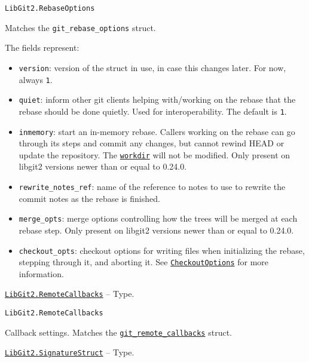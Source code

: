 \begin{adjustwidth}{2em}{0pt}


\begin{verbatim}
LibGit2.RebaseOptions
\end{verbatim}

Matches the \texttt{git\_rebase\_options} struct.

The fields represent:

\begin{itemize}
\item \texttt{version}: version of the struct in use, in case this changes later. For now, always \texttt{1}.


\item \texttt{quiet}: inform other git clients helping with/working on the rebase that the rebase should be done {\textquotedbl}quietly{\textquotedbl}. Used for interoperability. The default is \texttt{1}.


\item \texttt{inmemory}: start an in-memory rebase. Callers working on the rebase can go through its steps and commit any changes, but cannot rewind HEAD or update the repository. The \hyperlink{6689577338311178757}{\texttt{workdir}} will not be modified. Only present on libgit2 versions newer than or equal to 0.24.0.


\item \texttt{rewrite\_notes\_ref}: name of the reference to notes to use to rewrite the commit notes as the rebase is finished.


\item \texttt{merge\_opts}: merge options controlling how the trees will be merged at each rebase step.  Only present on libgit2 versions newer than or equal to 0.24.0.


\item \texttt{checkout\_opts}: checkout options for writing files when initializing the rebase, stepping through it, and aborting it. See \hyperlink{16441061243067746546}{\texttt{CheckoutOptions}} for more information.

\end{itemize}


\end{adjustwidth}
\hypertarget{5220283667301575523}{}
\hyperlink{5220283667301575523}{\texttt{LibGit2.RemoteCallbacks}}  -- {Type.}

\begin{adjustwidth}{2em}{0pt}


\begin{verbatim}
LibGit2.RemoteCallbacks
\end{verbatim}

Callback settings. Matches the \href{https://libgit2.org/libgit2/\#HEAD/type/git\_remote\_callbacks}{\texttt{git\_remote\_callbacks}} struct.



\end{adjustwidth}
\hypertarget{8598007626850742967}{}
\hyperlink{8598007626850742967}{\texttt{LibGit2.SignatureStruct}}  -- {Type.}

